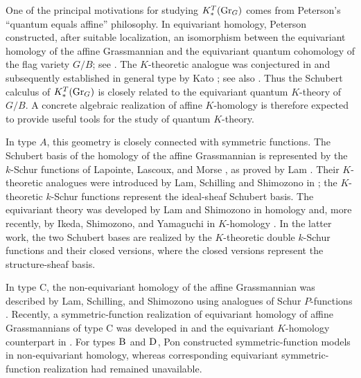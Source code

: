\documentclass[a4paper]{amsart}
\theoremstyle{remark}
\numberwithin{equation}{section}
\begin{document}
One of the principal motivations for studying \(K_*^T(\mathrm{Gr}_G)\) comes from Peterson's ``quantum equals affine'' philosophy. In equivariant homology, Peterson constructed, after suitable localization, an isomorphism between the equivariant homology of the affine Grassmannian and the equivariant quantum cohomology of the flag variety \(G/B\); see \cite{Pet,LS}. The \(K\)-theoretic analogue was conjectured in \cite{LLMS} and subsequently established in general type by Kato \cite{Kato}; see also \cite{CL}. Thus the Schubert calculus of \(K_*^T(\mathrm{Gr}_G)\) is closely related to the equivariant quantum \(K\)-theory of \(G/B\). A concrete algebraic realization of affine \(K\)-homology is therefore expected to provide useful tools for the study of quantum \(K\)-theory.





In type \(A\), this geometry is closely connected with symmetric functions. The Schubert basis of the homology of the affine Grassmannian is represented by the \(k\)-Schur functions of Lapointe, Lascoux, and Morse \cite{LLM}, as proved by Lam \cite{Lam}. Their \(K\)-theoretic analogues were introduced by Lam, Schilling and Shimozono in \cite{LSS:K}; the \(K\)-theoretic \(k\)-Schur functions represent the ideal-sheaf Schubert basis. 
The equivariant theory was developed by Lam and Shimozono \cite{LS:A} in homology and, more recently, by Ikeda, Shimozono, and Yamaguchi in \(K\)-homology \cite{ISY}. In the latter work, the two Schubert bases are realized by the \(K\)-theoretic double \(k\)-Schur functions and their closed versions, where the closed versions represent the structure-sheaf basis.

In type \(\mathrm{C}\), the non-equivariant homology of the affine Grassmannian was described by Lam, Schilling, and Shimozono using analogues of Schur  \(P\)-functions \cite{LSS:C}. Recently, a symmetric-function realization of equivariant homology of affine Grassmannians of type $\mathrm{C}$ was developed in \cite{IIS} and the equivariant $K$-homology counterpart in \cite{ISY2}.
For types $\mathrm{B}_{}$ and $\mathrm{D}_{}$, Pon \cite{Pon} constructed symmetric-function models in non-equivariant homology, whereas corresponding equivariant symmetric-function realization had remained unavailable.


 
\end{document}
